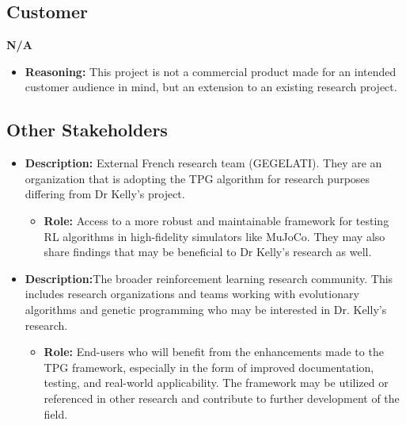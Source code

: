 \documentclass[12pt]{article}
\begin{document}
\subsection{Customer}
\textbf{N/A}
\begin{itemize}
\item \textbf{Reasoning:} This project is not a commercial product made for an intended customer audience in mind, but an extension to an existing research project.
\end{itemize}


\subsection{Other Stakeholders}
\begin{itemize}

\item \textbf{Description:} External French research team (GEGELATI). They are an organization that is adopting the TPG algorithm for research purposes differing from Dr Kelly’s project.
\begin{itemize}
  \item \textbf{Role:} Access to a more robust and maintainable framework for testing RL algorithms in high-fidelity simulators like MuJoCo. They may also share findings that may be beneficial to Dr Kelly’s research as well.

\end{itemize}


\item \textbf{Description:}The broader reinforcement learning research community. This includes research organizations and teams working with evolutionary algorithms and genetic programming who may be interested in Dr. Kelly’s research.
\begin{itemize}
  \item \textbf{Role:} End-users who will benefit from the enhancements made to the TPG framework, especially in the form of improved documentation, testing, and real-world applicability. The framework may be utilized or referenced in other research and contribute to further development of the field.

\end{itemize}

\end{itemize}
\end{document}
